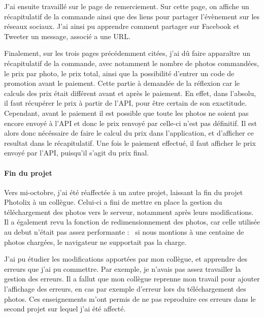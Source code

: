 \documentclass[12pt,a4paper]{article}
\begin{document}
  \bigskip

  J'ai ensuite travaillé sur le page de remerciement. Sur cette page, on
  affiche un récapitulatif de la commande ainsi que des liens pour
  partager l'évènement sur les réseaux sociaux. J'ai ainsi pu apprendre
  comment partager sur Facebook et Tweeter un message, associé a une URL.

  \bigskip

  Finalement, sur les trois pages précédemment citées, j'ai dû faire
  apparaître un récapitulatif de la commande, avec notamment le nombre de
  photos commandées, le prix par photo, le prix total, ainsi que la
  possibilité d'entrer un code de promotion avant le paiement. Cette
  partie à demandée de la réflexion car le calculs des prix était
  différent avant et après le paiement. En effet, dans l'absolu, il faut
  récupérer le prix à partir de l'API, pour être certain de son
  exactitude. Cependant, avant le paiement il est possible que toute les
  photos ne soient pas encore envoyé à l'API et donc le prix renvoyé par
  celle-ci n'est pas définitif. Il est alors donc nécéssaire de faire le
  calcul du prix dans l'application, et d'afficher ce resultat dans le
  récapitulatif. Une fois le paiement effectué, il faut afficher le prix
  envoyé par l'API, puisqu'il s'agit du prix final.

  \bigskip

  \paragraph{Fin du projet}\label{fin-du-projet}

  \bigskip

  Vers mi-octobre, j'ai été réaffectée à un autre projet, laissant la fin
  du projet Photolix à un collègue. Celui-ci a fini de mettre en place la
  gestion du téléchargement des photos vers le serveur, notamment après
  leurs modifications. Il a également revu la fonction de
  redimensionnement des photos, car celle utilisée au debut n'était pas
  assez performante : ~si nous montions à une centaine de photos chargées,
  le navigateur ne supportait pas la charge.

  \bigskip

  J'ai pu étudier les modifications apportées par mon collègue, et
  apprendre des erreurs que j'ai pu commettre. Par exemple, je n'avais pas
  assez travailler la gestion des erreurs. Il a fallut que mon collègue
  reprenne mon travail pour ajouter l'affichage des erreurs, en cas par
  exemple d'erreur lors du téléchargement des photos. Ces enseignements
  m'ont permis de ne pas reproduire ces erreurs dans le second projet sur
  lequel j'ai été affecté.
\end{document}

